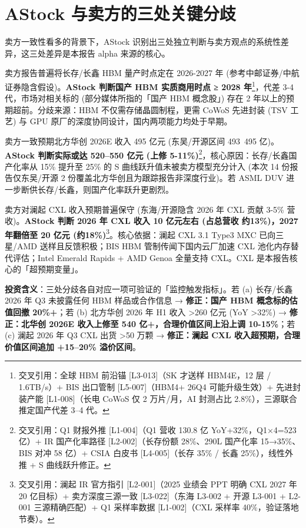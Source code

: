 \section{AStock 与卖方的三处关键分歧}

卖方一致性看多的背景下，AStock 识别出三处独立判断与卖方观点的系统性差异，这三处差异是本报告 alpha 来源的核心。

\begin{keyinsight}
卖方报告普遍将长存\slash 长鑫 HBM 量产时点定在 2026-2027 年 (参考中邮证券/中航证券隐含假设)。\textbf{AStock 判断国产 HBM 实质商用时点 ≥ 2028 年}\footnote{交叉引用：全球 HBM 前沿锚 [L3-013]（SK 才送样 HBM4E，12 层 / 1.6TB/s）+ BIS 出口管制 [L5-007]（HBM4+ 26Q4 可能升级生效）+ 先进封装产能 [L1-008]（长电 CoWoS 仅 2 万片/月，AI 封测占比 2.8\%），三源联合推定国产代差 3--4 代。}，代差 3-4 代，市场对相关标的 (部分媒体所指的「国产 HBM 概念股」) 存在 2 年以上的预期超前。分歧来源：HBM 不仅需存储晶圆制程，更需 CoWoS 先进封装 (TSV 工艺) 与 GPU 原厂的深度协同设计，国内两项能力均处于早期。
\end{keyinsight}

\begin{keyinsight}
卖方一致预期北方华创 2026E 收入 495 亿元 (东吴/开源区间 493~495 亿)。\textbf{AStock 判断实际或达 520--550 亿元 (上修 5-11\%)}\footnote{交叉引用：Q1 财报外推 [L1-004]（Q1 营收 130.8 亿 YoY+32\%，Q1×4=523 亿）+ IR 国产化率路径 [L2-002]（长存份额 28\%、290L 国产化率 15→35\%、BIS 对冲 58 亿）+ CSIA 白皮书 [L4-005]（长存 35\% / 长鑫 25\%），线性外推 + S 曲线跃升修正。}，核心原因：长存\slash 长鑫国产化率从 15\% 提升至 25\% 的 S 曲线跃升值未被卖方模型充分计入 (本次 14 份报告仅东吴/开源 2 份覆盖北方华创且为跟踪报告非深度行业)。若 ASML DUV 进一步断供长存\slash 长鑫，则国产化率跃升更剧烈。
\end{keyinsight}

\begin{keyinsight}
卖方对澜起 CXL 收入预期普遍保守 (东海/开源隐含 2026 年 CXL 贡献 3-5\% 营收)。\textbf{AStock 判断 2026 年 CXL 收入 10 亿元左右 (占总营收 约13\%)，2027 年翻倍至 20 亿元 (约18\%)}\footnote{交叉引用：澜起 IR 官方指引 [L2-001]（2025 业绩会 PPT 明确 CXL 2027 年 20 亿目标）+ 卖方深度三源一致 [L3-022]（东海 L3-002 + 开源 L3-001 + L2-001 三源精确匹配）+ Q1 采样率数据 [L1-002]（CXL 采样率 40\%，验证落地节奏）。}。核心依据：澜起 CXL 3.1 Type3 MXC 已向三星/AMD 送样且反馈积极；BIS HBM 管制传闻下国内云厂加速 CXL 池化内存替代评估；Intel Emerald Rapids + AMD Genoa 全量支持 CXL。CXL 是本报告核心的「超预期变量」。
\end{keyinsight}

\vspace{0.4em}
\noindent\textbf{投资含义}：三处分歧各自对应一项可验证的「监控触发指标」。若 (a) 长存\slash 长鑫 2026 年 Q3 未披露任何 HBM 样品或合作信息 → \textbf{修正：国产 HBM 概念标的估值回撤 20\%+}；若 (b) 北方华创 2026 年 H1 收入 >260 亿元 (YoY >32\%) → \textbf{修正：北华创 2026E 收入上修至 540 亿+，合理价值区间上沿上调 10-15\%}；若 (c) 澜起 2026 年 Q3 CXL 出货 >50 万颗 → \textbf{修正：澜起 CXL 收入超预期，合理价值区间追加 +15--20\% 溢价区间}。
